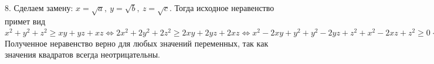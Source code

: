 8. Сделаем замену: $x=\sqrt{a},\ y=\sqrt{b},\ z=\sqrt{c}.$ Тогда исходное неравенство примет вид $x^2+y^2+z^2\geqslant xy+yz+xz\Leftrightarrow
2x^2+2y^2+2z^2\geqslant 2xy+2yz+2xz\Leftrightarrow x^2-2xy+y^2+y^2-2yz+z^2+x^2-2xz+z^2\geqslant 0\Leftrightarrow (x-y)^2+(y-z)^2+(x-z)^2\geqslant 0.$
Полученное неравенство верно для любых значений переменных, так как значения квадратов всегда неотрицательны.\\
